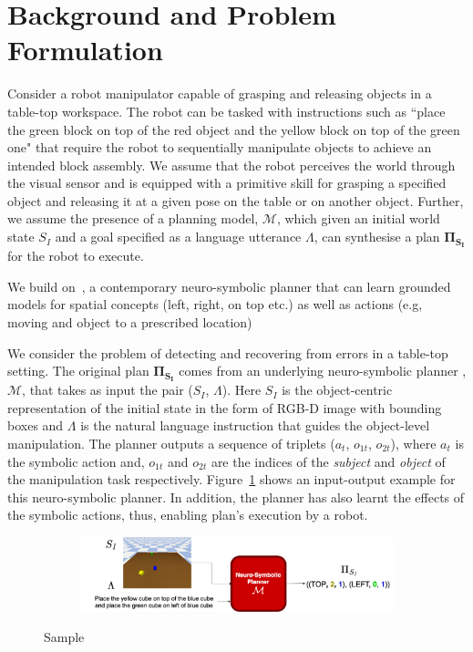 \section{Background and Problem Formulation}\label{sec:problem}
Consider a robot manipulator capable of grasping and releasing objects in a table-top workspace. 
%
The robot can be tasked with instructions such as ``place the green block on top of the red object and the yellow block on top of the green one" that require the robot to sequentially manipulate objects to achieve an intended block assembly. 
%
We assume that the robot perceives the world through the visual sensor and is equipped with a primitive skill for grasping a specified object and releasing it at a given pose on the table or on another object. 
%
Further, we assume the presence of a planning model, $\mathcal{M}$, which given an initial world state $S_I$ and a goal specified as a language utterance $\mathit{\Lambda}$, can synthesise a plan $\mathbf{\Pi_{S_I}}$ for the robot to execute. 

We build on~\citep{Kalithasan2022LearningNP}, a contemporary neuro-symbolic planner that can learn grounded models for spatial concepts (left, right, on top etc.) as well as actions (e.g, moving and object to a prescribed location)


We consider the problem of detecting and recovering from errors in a table-top setting. The original plan $\mathbf{\Pi_{S_I}}$ comes from an underlying neuro-symbolic planner \cite{Kalithasan2022LearningNP}, $\mathcal{M}$, that takes as input the pair ($S_I$, $\mathit{\Lambda}$). Here $S_I$ is the object-centric representation of the initial state in the form of RGB-D image with bounding boxes and $\mathit{\Lambda}$ is the natural language instruction that guides the object-level manipulation. The planner outputs a sequence of triplets ($a_t$, $o_{1t}$, $o_{2t}$), where $a_t$ is the symbolic action and, $o_{1t}$ and $o_{2t}$ are the indices of the \textit{subject} and \textit{object} of the manipulation task respectively. Figure~\ref{fig:nsrm} shows an input-output example for this neuro-symbolic planner. In addition, the planner has also learnt the effects of the symbolic actions, thus, enabling plan's execution by a robot.

\begin{figure}[h!]
    \begin{subfigure}{1.0\hsize}
         \centering    
         \includegraphics[scale=0.19]{figures/nsrm.png}
    \end{subfigure}
    \caption{
        \footnotesize{
            Sample
        }
    }
    \vspace{-0.15in}
    \label{fig:nsrm}
\end{figure}

